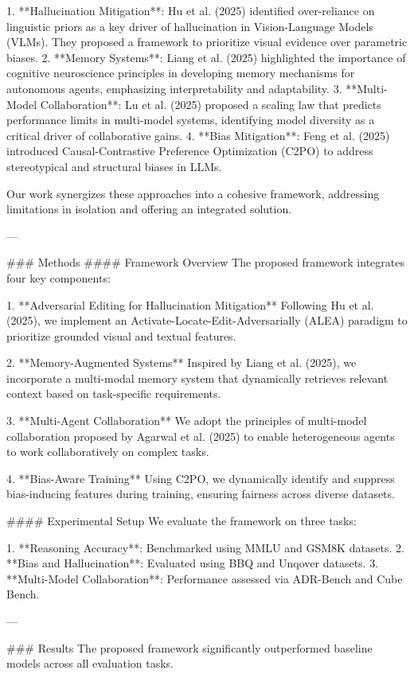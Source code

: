 1. **Hallucination Mitigation**: Hu et al. (2025) identified over-reliance on linguistic priors as a key driver of hallucination in Vision-Language Models (VLMs). They proposed a framework to prioritize visual evidence over parametric biases.
2. **Memory Systems**: Liang et al. (2025) highlighted the importance of cognitive neuroscience principles in developing memory mechanisms for autonomous agents, emphasizing interpretability and adaptability.
3. **Multi-Model Collaboration**: Lu et al. (2025) proposed a scaling law that predicts performance limits in multi-model systems, identifying model diversity as a critical driver of collaborative gains.
4. **Bias Mitigation**: Feng et al. (2025) introduced Causal-Contrastive Preference Optimization (C2PO) to address stereotypical and structural biases in LLMs.

Our work synergizes these approaches into a cohesive framework, addressing limitations in isolation and offering an integrated solution.

---

### Methods  
#### Framework Overview  
The proposed framework integrates four key components:  

1. **Adversarial Editing for Hallucination Mitigation**  
   Following Hu et al. (2025), we implement an Activate-Locate-Edit-Adversarially (ALEA) paradigm to prioritize grounded visual and textual features.  

2. **Memory-Augmented Systems**  
   Inspired by Liang et al. (2025), we incorporate a multi-modal memory system that dynamically retrieves relevant context based on task-specific requirements.  

3. **Multi-Agent Collaboration**  
   We adopt the principles of multi-model collaboration proposed by Agarwal et al. (2025) to enable heterogeneous agents to work collaboratively on complex tasks.  

4. **Bias-Aware Training**  
   Using C2PO, we dynamically identify and suppress bias-inducing features during training, ensuring fairness across diverse datasets.  

#### Experimental Setup  
We evaluate the framework on three tasks:  

1. **Reasoning Accuracy**: Benchmarked using MMLU and GSM8K datasets.  
2. **Bias and Hallucination**: Evaluated using BBQ and Unqover datasets.  
3. **Multi-Model Collaboration**: Performance assessed via ADR-Bench and Cube Bench.  

---

### Results  
The proposed framework significantly outperformed baseline models across all evaluation tasks.  

